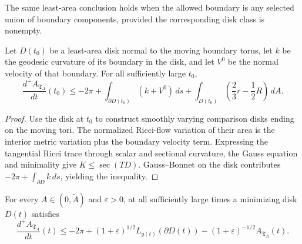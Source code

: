 \begin{remark}
\label{rem:chow-iv-relative-meeks-yau}
The same least-area conclusion holds when the allowed boundary is any selected
union of boundary components, provided the corresponding disk class is
nonempty.
\end{remark}

\begin{lemma}
\label{lem:chow-iv-minimizing-disk-first-variation}
Let \(D(t_0)\) be a least-area disk normal to the moving boundary torus, let
\(k\) be the geodesic curvature of its boundary in the disk, and let \(V^0\)
be the normal velocity of that boundary.  For all sufficiently large \(t_0\),
\[
 \frac{d^+A_{\mathfrak T_A}}{dt}(t_0)\le -2\pi
 +\int_{\partial D(t_0)}(k+V^0)\,ds
 +\int_{D(t_0)}\left(\frac23r-\frac12R\right)\,dA.
\]
\end{lemma}

\begin{proof}
\sketch
Use the disk at \(t_0\) to construct smoothly varying comparison disks ending
on the moving tori.  The normalized Ricci-flow variation of their area is the
interior metric variation plus the boundary velocity term.  Expressing the
tangential Ricci trace through scalar and sectional curvature, the Gauss
equation and minimality give \(K\le\operatorname{sec}(TD)\).  Gauss--Bonnet on
the disk contributes \(-2\pi+\int_{\partial D}k\,ds\), yielding the inequality.
\end{proof}

\begin{lemma}
\label{lem:chow-iv-minimizing-disk-evolution}
For every \(A\in(0,\widetilde A)\) and \(\varepsilon>0\), at all sufficiently
large times a minimizing disk \(D(t)\) satisfies
\[
 \frac{d^+A_{\mathfrak T_A}}{dt}(t)\le-2\pi
 +(1+\varepsilon)^{1/2}L_{g(t)}(\partial D(t))
 -(1+\varepsilon)^{-1/2}A_{\mathfrak T_A}(t).
\]
\end{lemma}

